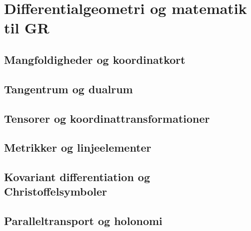 \chapter{Differentialgeometri og matematik til GR}
\section{Mangfoldigheder og koordinatkort}
\leavevmode\par

\section{Tangentrum og dualrum}
\leavevmode\par

\section{Tensorer og koordinattransformationer}
\leavevmode\par

\section{Metrikker og linjeelementer}
\leavevmode\par

\section{Kovariant differentiation og Christoffelsymboler}
\leavevmode\par

\section{Paralleltransport og holonomi}
\leavevmode\par


